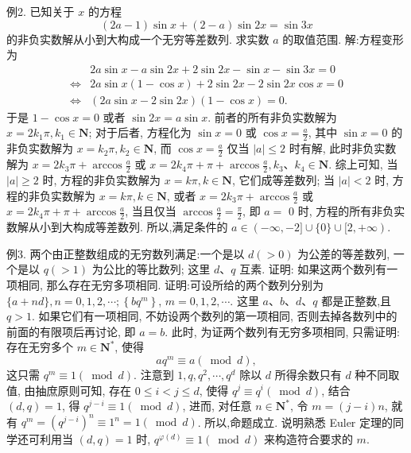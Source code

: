 例2. 已知关于 $x$ 的方程
$$
(2 a-1) \sin x+(2-a) \sin 2 x=\sin 3 x
$$
的非负实数解从小到大构成一个无穷等差数列.
求实数 $a$ 的取值范围.
解:方程变形为
$$
\begin{aligned}
& 2 a \sin x-a \sin 2 x+2 \sin 2 x-\sin x-\sin 3 x=0 \\
\Leftrightarrow & 2 a \sin x(1-\cos x)+2 \sin 2 x-2 \sin 2 x \cos x=0 \\
\Leftrightarrow & (2 a \sin x-2 \sin 2 x)(1-\cos x)=0 .
\end{aligned}
$$
于是 $1-\cos x=0$ 或者 $\sin 2 x=a \sin x$.
前者的所有非负实数解为 $x=2 k_1 \pi, k_1 \in \mathbf{N}$; 对于后者, 方程化为 $\sin x=0$ 或 $\cos x=\frac{a}{2}$, 其中 $\sin x=0$ 的非负实数解为 $x=k_2 \pi, k_2 \in \mathbf{N}$, 而 $\cos x=\frac{a}{2}$ 仅当 $|a| \leqslant 2$ 时有解, 此时非负实数解为 $x=2 k_3 \pi+\arccos \frac{a}{2}$ 或 $x=2 k_4 \pi+\pi+\arccos \frac{a}{2}, k_3 、 k_4 \in \mathbf{N}$.
综上可知, 当 $|a| \geqslant 2$ 时, 方程的非负实数解为 $x=k \pi, k \in \mathbf{N}$, 它们成等差数列; 当 $|a|<2$ 时, 方程的非负实数解为 $x=k \pi, k \in \mathbf{N}$, 或者 $x= 2 k_3 \pi+\arccos \frac{a}{2}$ 或 $x=2 k_4 \pi+\pi+\arccos \frac{a}{2}$, 当且仅当 $\arccos \frac{a}{2}=\frac{\pi}{2}$, 即 $a=$ 0 时, 方程的所有非负实数解从小到大构成等差数列.
所以,满足条件的 $a \in(-\infty,-2] \cup\{0\} \cup[2,+\infty)$.



例3. 两个由正整数组成的无穷数列满足:一个是以 $d(>0)$ 为公差的等差数列, 一个是以 $q(>1)$ 为公比的等比数列; 这里 $d 、 q$ 互素.
证明: 如果这两个数列有一项相同, 那么存在无穷多项相同.
证明:可设所给的两个数列分别为 $\{a+n d\}, n=0,1,2, \cdots ;\left\{b q^m\right\}$, $m=0,1,2, \cdots$. 这里 $a 、 b 、 d 、 q$ 都是正整数,且 $q>1$.
如果它们有一项相同, 不妨设两个数列的第一项相同, 否则去掉各数列中的前面的有限项后再讨论, 即 $a=b$. 此时, 为证两个数列有无穷多项相同, 只需证明:存在无穷多个 $m \in \mathbf{N}^*$, 使得
$$
a q^m \equiv a(\bmod d),
$$
这只需 $q^m \equiv 1(\bmod d)$.
注意到 $1, q, q^2, \cdots, q^d$ 除以 $d$ 所得余数只有 $d$ 种不同取值, 由抽庶原则可知, 存在 $0 \leqslant i<j \leqslant d$, 使得 $q^j \equiv q^i(\bmod d)$, 结合 $(d, q)=1$, 得 $q^{j-i} \equiv 1(\bmod d)$, 进而, 对任意 $n \in \mathbf{N}^*$, 令 $m=(j-i) n$, 就有 $q^m=\left(q^{j-i}\right)^n \equiv 1^n= 1(\bmod d)$.
所以,命题成立.
说明熟悉 Euler 定理的同学还可利用当 $(d, q)=1$ 时, $q^{\varphi(d)} \equiv 1(\bmod d)$ 来构造符合要求的 $m$.



